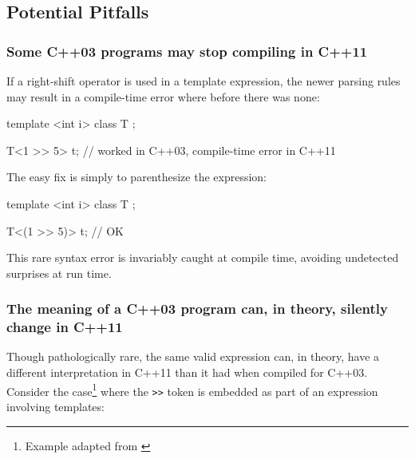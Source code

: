 \subsection[Potential Pitfalls]{Potential Pitfalls}\label{potential-pitfalls}

\subsubsection[Some C++03 programs may stop compiling in C++11]{Some C++03 programs may stop compiling in C++11}\label{some-c++03-programs-may-stop-working-in-c++11}

If a right-shift operator is used in a template expression, the newer
parsing rules may result in a compile-time error where before there was
none:

\begin{emcppshiddenlisting}[emcppsbatch=ped1,emcppsstandards=c++03]
template <int i> class T {};
\end{emcppshiddenlisting}
\begin{emcppslisting}[emcppsbatch=ped1]
T<1 >> 5> t;  // worked in C++03, compile-time error in C++11
\end{emcppslisting}

\noindent The easy fix is simply to parenthesize the expression:

\begin{emcppshiddenlisting}[emcppsbatch=ped2,emcppsstandards={c++11,c++14}]
template <int i> class T {};
\end{emcppshiddenlisting}
\begin{emcppslisting}[emcppsbatch=ped2]
T<(1 >> 5)> t;  // OK
\end{emcppslisting}

\noindent This rare syntax error is invariably caught at compile time, avoiding undetected surprises at run time.

\subsubsection[The meaning of a C++03 program can, in theory, silently change in C++11]{The meaning of a C++03 program can, in theory, silently change in C++11}\label{the-meaning-of-a-c++03-program-can-(in-theory)-silently-change-in-c++11}

Though pathologically rare, the same valid expression can, in theory, have a different interpretation in C++11 than it had when compiled for C++03.
Consider the case{\cprotect\footnote{Example adapted from \cite{gustedt13}}} where the
\lstinline!>>! token is embedded as part of an expression involving
templates:

